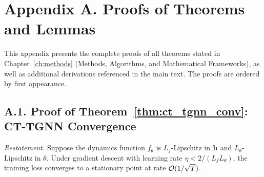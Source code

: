 
\chapter*{Appendix A. Proofs of Theorems and Lemmas}
\label{app:proofs}

This appendix presents the complete proofs of all theorems stated in
Chapter~\ref{ch:methods} (Methods, Algorithms, and Mathematical
Frameworks), as well as additional derivations referenced in the main
text. The proofs are ordered by first appearance.


\section*{A.1. Proof of Theorem~\ref{thm:ct_tgnn_conv}: CT-TGNN Convergence}
\label{app:proof_ct_conv}

\noindent\textit{Restatement.} Suppose the dynamics function $f_\theta$ is $L_f$-Lipschitz in $\mathbf{h}$ and $L_\theta$-Lipschitz in $\theta$. Under gradient descent with learning rate $\eta<2/(L_f L_\theta)$, the training loss converges to a stationary point at rate $\mathcal{O}(1/\sqrt{T})$.

